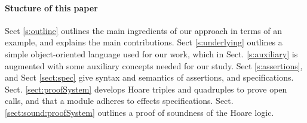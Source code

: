  \paragraph{Stucture of this paper}
Sect \ref{s:outline}   outlines the main ingredients of our approach in terms of an example, and explains the main contributions.
Sect \ref{s:underlying} outlines a simple object-oriented language used for our work, which in Sect. \ref{s:auxiliary} is augmented with some auxiliary concepts needed for our study.
Sect \ref{s:assertions}, and Sect \ref{sect:spec}  give syntax and semantics of  assertions, and  specifications.
Sect. \ref{sect:proofSystem} develops Hoare triples and quadruples to prove open calls, and that a module adheres to \tamed effects specifications.
Sect. \ref{sect:sound:proofSystem} outlines a proof of soundness of the Hoare logic. 
 
 
 

